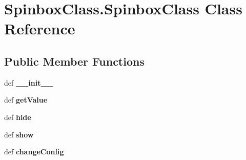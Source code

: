 \hypertarget{classSpinboxClass_1_1SpinboxClass}{\section{Spinbox\+Class.\+Spinbox\+Class Class Reference}
\label{classSpinboxClass_1_1SpinboxClass}
}
\subsection*{Public Member Functions}
\begin{DoxyCompactItemize}
\item 
\hypertarget{classSpinboxClass_1_1SpinboxClass_a8021362d4589716bbed55488d1da94ed}{def {\bfseries \+\_\+\+\_\+init\+\_\+\+\_\+}}\label{classSpinboxClass_1_1SpinboxClass_a8021362d4589716bbed55488d1da94ed}

\item 
\hypertarget{classSpinboxClass_1_1SpinboxClass_a2a99fbbf8e719ffbad746134cac7f860}{def {\bfseries get\+Value}}\label{classSpinboxClass_1_1SpinboxClass_a2a99fbbf8e719ffbad746134cac7f860}

\item 
\hypertarget{classSpinboxClass_1_1SpinboxClass_abf54b6a4c6498d32d8591a626445e52f}{def {\bfseries hide}}\label{classSpinboxClass_1_1SpinboxClass_abf54b6a4c6498d32d8591a626445e52f}

\item 
\hypertarget{classSpinboxClass_1_1SpinboxClass_a918fdc6e0280b4e18a21833defe4ef3f}{def {\bfseries show}}\label{classSpinboxClass_1_1SpinboxClass_a918fdc6e0280b4e18a21833defe4ef3f}

\item 
\hypertarget{classSpinboxClass_1_1SpinboxClass_a2043bd043f12dece33c4b26c163a0078}{def {\bfseries change\+Config}}\label{classSpinboxClass_1_1SpinboxClass_a2043bd043f12dece33c4b26c163a0078}

\end{DoxyCompactItemize}
